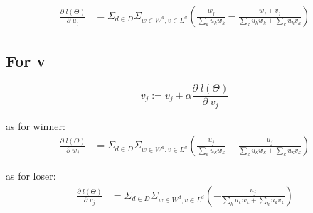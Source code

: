 \documentclass{article}
\begin{document}
\begin{align}
\frac{\partial \;l(\Theta) }{\partial \;u_j}
 &= \Sigma_{d \in D} \Sigma_{w\in W^d, v\in L^d}(\frac{w_j}{\sum_k u_k w_k}-\frac{w_j+v_j}{\sum_k u_k w_k+\sum_k u_k v_k})
\end{align}

\subsection{For v}

$$v_j:= v_j + \alpha \frac{\partial \;l(\Theta) }{\partial \;v_j}$$

as for winner:
\begin{align}
\frac{\partial \;l(\Theta)}{\partial \;w_j}
&=  \Sigma_{d \in D} \Sigma_{w\in W^d, v\in L^d}(\frac{u_j}{\sum_k u_k w_k}-\frac{u_j}{\sum_k u_k w_k+\sum_k u_k v_k})
\end{align}

as for loser:
\begin{align}
\frac{\partial \;l(\Theta)}{\partial \;v_j}
&=  \Sigma_{d \in D} \Sigma_{w\in W^d, v\in L^d}(-\frac{u_j}{\sum_k u_k w_k+\sum_k u_k v_k})
\end{align}
\end{document}

